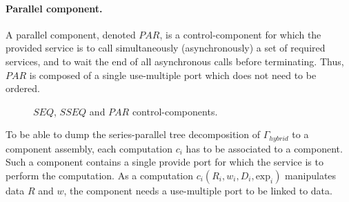 \paragraph{Parallel component.} A parallel component, denoted $PAR$, is a control-component for which the provided service is to call simultaneously (asynchronously) a set of required services, and to wait the end of all asynchronous calls before terminating. Thus, $PAR$ is composed of a single use-multiple port which does not need to be ordered.

\begin{figure}[h!]
\captionsetup[subfigure]{labelformat=empty}
\begin{center}
\hspace{50pt}
\hspace{50pt}
\caption{$SEQ$, $SSEQ$ and $PAR$ control-components.}
\label{fig:control}
\end{center}
\end{figure}

To be able to dump the series-parallel tree decomposition of $\Gamma_{hybrid}$ to a component assembly, each computation $c_i$ has to be associated to a component. Such a component contains a single provide port for which the service is to perform the computation. As a computation $c_i(R_i,w_i,D_i,\text{exp}_i)$ manipulates data $R$ and $w$, the component needs a use-multiple port to be linked to data.

